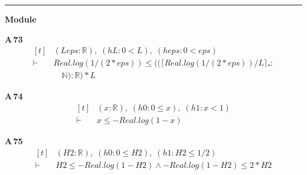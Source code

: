 \vspace{4pt}\noindent\rule{\columnwidth}{0.4pt}\par\vspace{2pt}
\noindent\textbf{Module }\par\vspace{3pt}

\noindent\textbf{A\,73}\quad{}
{\footnotesize\[ \begin{aligned}[t]
&(\mathit{L} \mathit{eps} : \mathbb{R} ),\; (\mathit{hL} : 0 < \mathit{L}),\; (\mathit{heps} : 0 < \mathit{eps})\\
\vdash\;&\mathit{Real}.\mathit{log} (1 / (2 * \mathit{eps})) \leq ((\lceil \mathit{Real}.\mathit{log} (1 / (2 * \mathit{eps})) / \mathit{L}\rceil ₊ :\\
&\quad \mathbb{N} ) : \mathbb{R} ) * \mathit{L}
\end{aligned} \]}

\noindent\textbf{A\,74}\quad{}
{\footnotesize\[ \begin{aligned}[t]
&(\mathit{x} : \mathbb{R} ),\; (\mathit{h0} : 0 \leq \mathit{x}),\; (\mathit{h1} : \mathit{x} < 1)\\
\vdash\;&\mathit{x} \leq -\mathit{Real}.\mathit{log} (1 - \mathit{x})
\end{aligned} \]}

\noindent\textbf{A\,75}\quad{}
{\footnotesize\[ \begin{aligned}[t]
&(\mathit{H2} : \mathbb{R} ),\; (\mathit{h0} : 0 \leq \mathit{H2}),\; (\mathit{h1} : \mathit{H2} \leq 1/2)\\
\vdash\;&\mathit{H2} \leq -\mathit{Real}.\mathit{log} (1 - \mathit{H2}) \wedge -\mathit{Real}.\mathit{log} (1 - \mathit{H2}) \leq 2 * \mathit{H2}
\end{aligned} \]}

